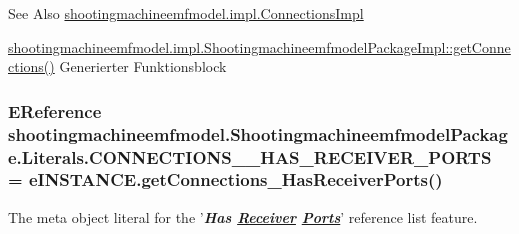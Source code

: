 \begin{DoxySeeAlso}{See Also}
\hyperlink{classshootingmachineemfmodel_1_1impl_1_1_connections_impl}{shootingmachineemfmodel.\-impl.\-Connections\-Impl} 

\hyperlink{classshootingmachineemfmodel_1_1impl_1_1_shootingmachineemfmodel_package_impl_a60e10b61ac1758c8993ad4ef5b5a192a}{shootingmachineemfmodel.\-impl.\-Shootingmachineemfmodel\-Package\-Impl\-::get\-Connections()} Generierter Funktionsblock 
\end{DoxySeeAlso}
\hypertarget{interfaceshootingmachineemfmodel_1_1_shootingmachineemfmodel_package_1_1_literals_a8be91145fa16d8559da3a9e953daa74b}{
\subsubsection[{C\-O\-N\-N\-E\-C\-T\-I\-O\-N\-S\-\_\-\-\_\-\-H\-A\-S\-\_\-\-R\-E\-C\-E\-I\-V\-E\-R\-\_\-\-P\-O\-R\-T\-S}]{\setlength{\rightskip}{0pt plus 5cm}E\-Reference shootingmachineemfmodel.\-Shootingmachineemfmodel\-Package.\-Literals.\-C\-O\-N\-N\-E\-C\-T\-I\-O\-N\-S\-\_\-\-\_\-\-H\-A\-S\-\_\-\-R\-E\-C\-E\-I\-V\-E\-R\-\_\-\-P\-O\-R\-T\-S = e\-I\-N\-S\-T\-A\-N\-C\-E.\-get\-Connections\-\_\-\-Has\-Receiver\-Ports()}}\label{interfaceshootingmachineemfmodel_1_1_shootingmachineemfmodel_package_1_1_literals_a8be91145fa16d8559da3a9e953daa74b}
The meta object literal for the '{\itshape {\bfseries Has \hyperlink{interfaceshootingmachineemfmodel_1_1_receiver}{Receiver} \hyperlink{interfaceshootingmachineemfmodel_1_1_ports}{Ports}}}' reference list feature.

